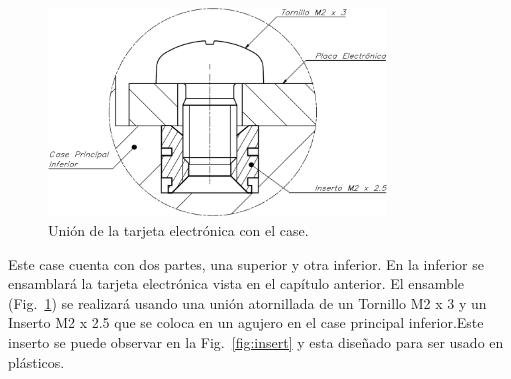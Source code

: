     

\begin{figure}[hbt!]
\centering
\includegraphics[width=0.8\textwidth]{union_atornillada.pdf}
\caption{Unión de la tarjeta electrónica con el case.}
\label{fig:ensamble_principal}
\end{figure}


\newpage

Este case cuenta con dos partes, una superior y otra inferior. En la inferior se ensamblará la tarjeta electrónica vista en el capítulo anterior. El ensamble (Fig.~\ref{fig:ensamble_principal}) se realizará usando una unión atornillada de un Tornillo M2 x 3 y un Inserto M2 x 2.5 que se coloca en un agujero en el case principal inferior.Este  inserto se puede observar en la Fig.~\ref{fig:insert} y esta diseñado para ser usado en plásticos.

\vspace{5mm}

